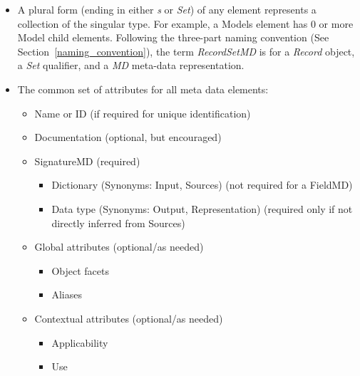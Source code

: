 \documentclass[10pt]{article}
\begin{document}
\begin{itemize}[label=-,noitemsep,topsep=0pt]
            \item A plural form (ending in either {\em s} or {\em Set}) of any element represents a collection of the singular type.  For
                example, a Models element has 0 or more Model child elements.  Following the three-part naming convention (See
                Section~\ref{naming_convention}), the term {\em RecordSetMD} is for a {\em Record} object, a {\em Set} qualifier, and a {\em
                MD} meta-data representation.

            \item The common set of attributes for all meta data elements:
                \begin{itemize}[label=-,noitemsep,topsep=0pt]
                    \item Name or ID (if required for unique identification)
                    \item Documentation (optional, but encouraged)
                    \item SignatureMD (required)
                        \begin{itemize}[label=-,noitemsep,topsep=0pt]
                            \item Dictionary (Synonyms: Input, Sources) (not required for a FieldMD)
                            \item Data type (Synonyms: Output, Representation) (required only if not directly inferred from Sources)
                        \end{itemize}
                    \item Global attributes (optional/as needed)
                        \begin{itemize}[label=-,noitemsep,topsep=0pt]
                            \item Object facets
                            \item Aliases
                        \end{itemize}
                    \item Contextual attributes (optional/as needed)
                        \begin{itemize}[label=-,noitemsep,topsep=0pt]
                            \item Applicability
                            \item Use
                        \end{itemize}
                \end{itemize}
        \end{itemize}
\end{document}
